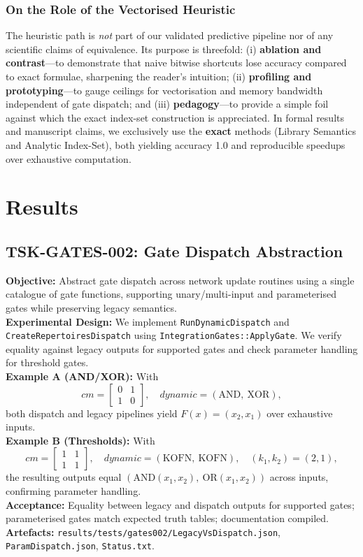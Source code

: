 \documentclass[11pt]{article}
\begin{document}
\subsubsection*{On the Role of the Vectorised Heuristic}
The heuristic path is \emph{not} part of our validated predictive pipeline nor of any scientific claims of equivalence. Its purpose is threefold: (i) \textbf{ablation and contrast}—to demonstrate that naive bitwise shortcuts lose accuracy compared to exact formulae, sharpening the reader’s intuition; (ii) \textbf{profiling and prototyping}—to gauge ceilings for vectorisation and memory bandwidth independent of gate dispatch; and (iii) \textbf{pedagogy}—to provide a simple foil against which the exact index-set construction is appreciated. In formal results and manuscript claims, we exclusively use the \textbf{exact} methods (Library Semantics and Analytic Index-Set), both yielding accuracy 1.0 and reproducible speedups over exhaustive computation.\\
\section{Results}
\subsection{TSK-GATES-002: Gate Dispatch Abstraction}
\textbf{Objective:} Abstract gate dispatch across network update routines using a single catalogue of gate functions, supporting unary/multi-input and parameterised gates while preserving legacy semantics.\\
\textbf{Experimental Design:} We implement \texttt{RunDynamicDispatch} and \texttt{CreateRepertoiresDispatch} using \texttt{Integration\textasciigrave Gates::ApplyGate}. We verify equality against legacy outputs for supported gates and check parameter handling for threshold gates.\\
\textbf{Example A (AND/XOR):} With
\[
cm = \begin{bmatrix}0 & 1\\ 1 & 0\end{bmatrix},\quad dynamic=(\text{AND},\ \text{XOR}),
\]
both dispatch and legacy pipelines yield \(F(x)=(x_2,x_1)\) over exhaustive inputs.\\
\textbf{Example B (Thresholds):} With
\[
cm = \begin{bmatrix}1 & 1\\ 1 & 1\end{bmatrix},\quad dynamic=(\text{KOFN},\ \text{KOFN}),\quad (k_1, k_2)=(2,1),
\]
the resulting outputs equal \((\text{AND}(x_1,x_2),\ \text{OR}(x_1,x_2))\) across inputs, confirming parameter handling.\\
\textbf{Acceptance:} Equality between legacy and dispatch outputs for supported gates; parameterised gates match expected truth tables; documentation compiled.\\
\textbf{Artefacts:} \texttt{results/tests/gates002/LegacyVsDispatch.json}, \texttt{ParamDispatch.json}, \texttt{Status.txt}.
\end{document}

